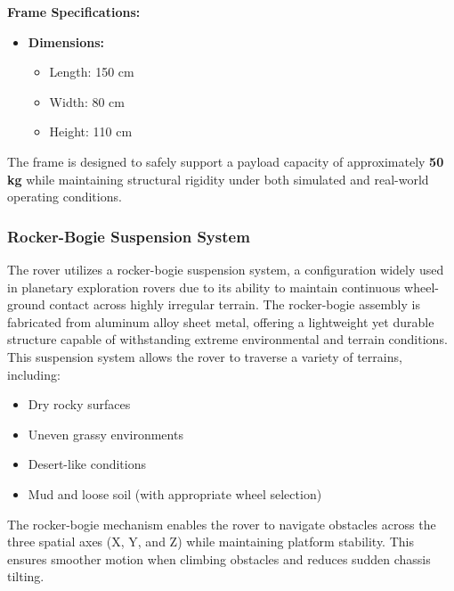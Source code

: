 \documentclass[11pt,a4paper]{article}
\begin{document}
\noindent\textbf{Frame Specifications:}
\begin{itemize}[left=0pt]
\setlength{\itemsep}{0pt}
\setlength{\parskip}{0pt}
\setlength{\parsep}{0pt}
\vspace{-7pt}
\item \textbf{Dimensions:}
    \begin{itemize}[left=0pt, label=-]
    \setlength{\itemsep}{0pt}
    \setlength{\parskip}{0pt}
    \setlength{\parsep}{0pt}
    \item Length: 150 cm
    \item Width: 80 cm
    \item Height: 110 cm
    \end{itemize}

\end{itemize}

The frame is designed to safely support a payload capacity of approximately \textbf{50 kg} while maintaining structural rigidity under both simulated and real-world operating conditions.


\subsubsection{Rocker-Bogie Suspension System} The rover utilizes a rocker-bogie suspension system, a configuration widely used in planetary exploration rovers due to its ability to maintain continuous wheel-ground contact across highly irregular terrain. The rocker-bogie assembly is fabricated from aluminum alloy sheet metal, offering a lightweight yet durable structure capable of withstanding extreme environmental and terrain conditions. This suspension system allows the rover to traverse a variety of terrains, including: \vspace{-7pt} \begin{itemize}[left=0pt, label=-] \setlength{\itemsep}{0pt} \setlength{\parskip}{0pt} \setlength{\parsep}{0pt} \item Dry rocky surfaces \item Uneven grassy environments \item Desert-like conditions \item Mud and loose soil (with appropriate wheel selection) \end{itemize} The rocker-bogie mechanism enables the rover to navigate obstacles across the three spatial axes (X, Y, and Z) while maintaining platform stability. This ensures smoother motion when climbing obstacles and reduces sudden chassis tilting.
\end{document}
